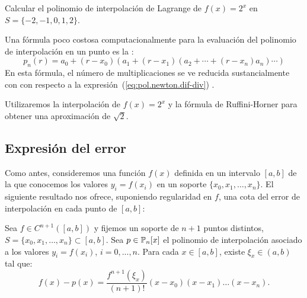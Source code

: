 \begin{example}
  Calcular el polinomio de interpolación de Lagrange de $f(x)=2^x$ en
  $S=\{-2,-1,0,1,2\}$. 
\end{example}

Una fórmula poco costosa computacionalmente para la evaluación del
polinomio de interpolación en un punto es la : 
\begin{equation*}
  p_n(r) = a_0 + (r-x_0)(a_1 + (r-x_1)(a_2 + \cdots + (r-x_n)a_n)\cdots)
\end{equation*}
En esta fórmula, el número de multiplicaciones se ve reducida
sustancialmente con con respecto a la
expresión~(\ref{eq:pol.newton.dif-div}) .
\begin{example}
  Utilizaremos la interpolación de $f(x)=2^x$ y la fórmula de
  Ruffini-Horner para obtener una aproximación de $\sqrt{2}$.
\end{example}

\subsection{Expresión del error}
\label{sec:error-interpol-lagrange}
Como antes, consideremos una función $f(x)$ definida en un intervalo
$[a,b]$ de la que conocemos los valores $y_i=f(x_i)$ en un soporte
$\{x_0,x_1,\dots,x_n\}$. El siguiente resultado nos ofrece, suponiendo
regularidad en $f$, una cota del error de interpolación en cada punto
de $[a,b]$:
\begin{theorem}
  \label{thm:error-interpol-lagrange}
  Sea $f\in C^{n+1}([a,b])$ y fijemos un soporte de $n+1$ puntos
  distintos, $S=\{x_0,x_1,\dots,x_n\}\subset[a,b]$. Sea
  $p\in\operatorname{{\mathbb P}}_n[x]$ el polinomio de interpolación asociado a los valores
  $y_i=f(x_i)$, $i=0,...,n$. Para cada $x\in[a,b]$, existe $\xi_x\in
  (a,b)$ tal que:
  \begin{equation}
    \label{eq:expresion-error-interpol}
    f(x)-p(x)=\frac{f^{n+1}(\xi_x)}{(n+1)!} (x-x_0)(x-x_1)\dots(x-x_n).
  \end{equation}
\end{theorem}

